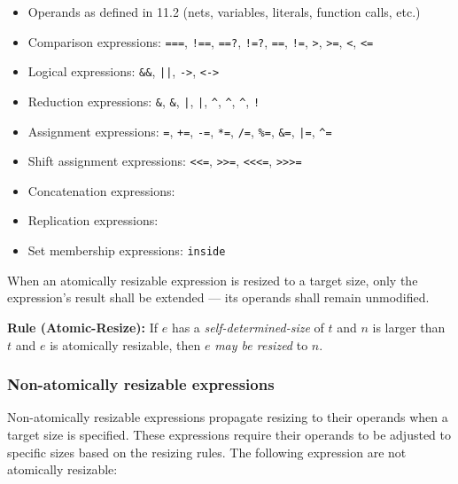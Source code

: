 \documentclass{article}
\newcommand{\tild}{\raisebox{-.7ex}{\textasciitilde{}}}
\newcommand{\sds}{\emph{self-determined-size}}
\newcommand{\mbr}{\emph{may be resized}}
\newenvironment{typingrule}[1]%
{\par\noindent\textbf{Rule (#1):} }%
{\par}
\begin{document}
\begin{itemize}
  \item Operands as defined in 11.2 (nets, variables, literals, function
    calls, etc.)
  \item Comparison expressions: \texttt{===}, \texttt{!==}, \texttt{==?},
    \texttt{!=?}, \texttt{==}, \texttt{!=}, \texttt{>}, \texttt{>=}, \texttt{<},
    \texttt{<=}
  \item Logical expressions: \texttt{\&\&}, \texttt{||}, \texttt{->},
    \texttt{<->}
  \item Reduction expressions: \texttt{\&}, \texttt{\tild\&}, \texttt{|},
    \texttt{\tild|}, \texttt{\^{}}, \texttt{\tild\^{}}, \texttt{\^{}\tild},
    \texttt{!}
  \item Assignment expressions: \texttt{=}, \texttt{+=}, \texttt{-=},
    \texttt{*=}, \texttt{/=}, \texttt{\%=}, \texttt{\&=},
    \texttt{|=}, \texttt{\^{}=}
  \item Shift assignment expressions: \texttt{<<=}, \texttt{>>=}, \texttt{<<<=},
    \texttt{>>>=}
  \item Concatenation expressions: \texttt{\string{\dots\string}}
  \item Replication expressions: \texttt{}
  \item Set membership expressions: \texttt{inside}
\end{itemize}

When an atomically resizable expression is resized to a
target size, only the expression's result shall be extended --- its operands
shall remain unmodified.

\begin{typingrule}{Atomic-Resize}
  If $e$ has a \sds{} of $t$ and $n$ is larger than $t$
  and $e$ is atomically resizable, then $e$ \mbr{} to $n$.
\end{typingrule}

\subsubsection{Non-atomically resizable expressions}%
\label{non-atomically-resizable-expressions}

Non-atomically resizable expressions propagate resizing to their operands when
a target size is specified. These expressions require their operands to be
adjusted to specific sizes based on the resizing rules. The following expression
are not atomically resizable:
\end{document}
